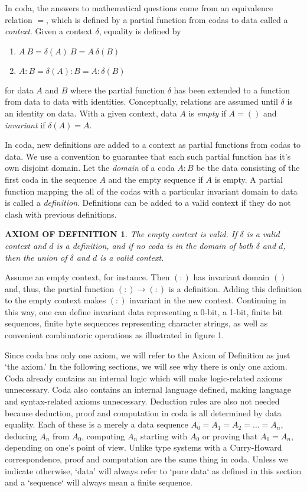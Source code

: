 \documentclass[11pt]{article}
\begin{document}
     In coda, the answers to mathematical questions come from an equivalence relation $=$, which is defined by a partial function from codas to data 
called a {\it context}.  Given a context $\delta$, equality is defined by 
\begin{enumerate}
\item[] $A\ B = \delta(A)\ B = A\ \delta(B)$
\item[] $A:B = \delta(A):B = A:\delta(B)$
\end{enumerate}
for data $A$ and $B$ where the partial function $\delta$ has been extended to a function from data to data with identities.   
Conceptually, relations are assumed until $\delta$ is an identity on data.  With a given context, data $A$ is {\it empty} if $A=()$ and {\it invariant} 
if $\delta(A)=A$.   

     In coda, new definitions are added to a context as partial functions from codas to data.  We use a convention to guarantee that each such partial 
function has it's own disjoint domain.  Let the {\it domain} of a coda $A:B$ be the data consisting of the first coda in the sequence $A$ and the empty 
sequence if $A$ is empty.  A partial function mapping the all of the codas with a particular invariant domain to data is called a {\it definition}.  Definitions 
can be added to a valid context if they do not clash with previous definitions.  

\newtheorem*{remark}{AXIOM OF DEFINITION} 
\begin{remark}  The empty context is valid.  If $\delta$ is a valid context and $d$ is a definition, and if no coda is in 
the domain of both $\delta$ and $d$, then the union of $\delta$ and $d$ is a valid context.  
\end{remark} 

\noindent Assume an empty context, for instance.  Then $(:)$ has invariant domain $()$ and, thus, the partial function $(:)\rightarrow (:)$ is a definition. 
Adding this definition to the empty context makes $(:)$ invariant in the new context.  Continuing in this way, one can define invariant data 
representing a 0-bit, a 1-bit, finite bit sequences, finite byte sequences representing character strings, as well as convenient combinatoric operations as 
illustrated in figure 1. 

    Since coda has only one axiom, we will refer to the Axiom of Definition as just `the axiom.'  In the following sections, we will see why there is only 
one axiom.  Coda already contains an internal logic which will make logic-related axioms unnecessary.  Coda also contains an internal language defined, making 
language and syntax-related axioms unnecessary.  Deduction rules are also not needed because deduction, proof and computation in coda is all determined 
by data equality.  Each of these is a merely a data sequence $A_0=A_1=A_2=\dots=A_n$, deducing $A_n$ from $A_0$, computing 
$A_n$ starting with $A_0$ or proving that $A_0=A_n$, depending on one's point of view.  Unlike type systems with a Curry-Howard correspondence, proof and computation are the same thing in coda.  Unless we indicate otherwise, `data' will always refer to `pure data` as defined in this section and 
a `sequence` will always mean a finite sequence.   
\end{document}
